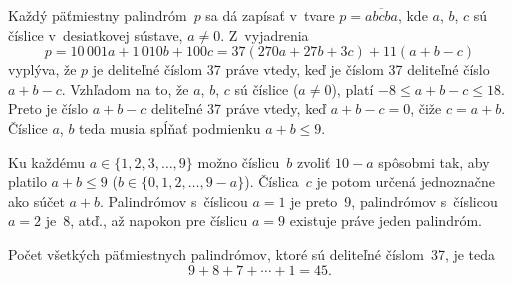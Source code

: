 {%
Každý päťmiestny palindróm~$p$ sa dá zapísať v~tvare
$p=\overline{abcba}$, kde $a$, $b$, $c$ sú číslice
v~desiatkovej sústave, $a\ne0$. Z~vyjadrenia
$$
p=10\,001a+1\,010b+100c=37(270a+27b+3c)+11(a+b-c)
$$
vyplýva, že $p$ je deliteľné číslom 37 práve vtedy, keď je číslom 37
deliteľné číslo $a+b-c$. Vzhľadom na to, že $a$, $b$, $c$ sú
číslice ($a\ne 0$), platí $-8\leq a+b-c\leq 18$. Preto je číslo
$a+b-c$ deliteľné 37 práve vtedy, keď $a+b-c=0$, čiže $c=a+b$.
Číslice $a$, $b$ teda musia spĺňať podmienku $a+b\le9$.

Ku každému $a\in\{1,2,3,\dots, 9\}$ možno číslicu~$b$ zvoliť $10-a$
spôsobmi tak, aby platilo $a+b\leq 9$ ($b\in\{0,1,2,\dots,9-a\}$).
Číslica~$c$ je potom určená jednoznačne ako súčet $a+b$.
Palindrómov s~číslicou $a=1$ je preto~9, palindrómov s~číslicou $a=2$
je~8, atď., až napokon pre číslicu $a=9$ existuje práve jeden
palindróm.

\smallskip
Počet všetkých päťmiestnych palindrómov, ktoré sú deliteľné
číslom~37, je teda
$$
9+8+7+\cdots+1=45.
$$}

